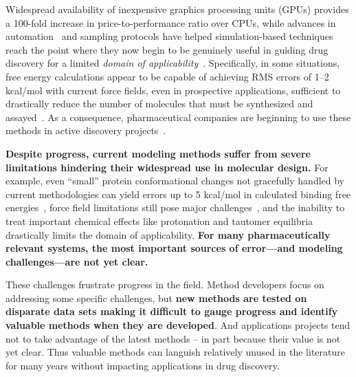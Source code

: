 \documentclass[11pt]{article}
\begin{document}
Widespread availability of inexpensive graphics processing units (GPUs) provides a 100-fold increase in price-to-performance ratio over CPUs, while advances in automation~\cite{liu_lead_2013} and sampling protocols have helped simulation-based techniques reach the point where they now begin to be genuinely useful in guiding drug discovery for a limited \emph{domain of applicability}~\cite{mikulskis_large-scale_2014, homeyer_binding_2014, Sherborne:2016:JComputAidedMolDes,  schrodinger_accurate_2015, christ_binding_2016, cui_affinity_2016, verras_free_2016}.
Specifically, in some situations, free energy calculations appear to be capable of achieving RMS errors of 1--2 kcal/mol with current force fields, even in prospective applications, sufficient to drastically reduce the number of molecules that must be synthesized and assayed~\cite{shirts_free-energy_2010, Aldeghi:2017:J.Am.Chem.Soc., schrodinger_accurate_2015}.
As a consequence, pharmaceutical companies are beginning to use these methods in active discovery projects~\cite{Sherborne:2016:JComputAidedMolDes}.

\textbf{Despite progress, current modeling methods suffer from severe limitations hindering their widespread use in molecular design.}
For example, even ``small'' protein conformational changes not gracefully handled by current methodologies can yield errors up to 5 kcal/mol in calculated binding free energies~\cite{lim_sensitivity_2016}, force field limitations still pose major challenges~\cite{rocklin_blind_2013}, and the inability to treat important chemical effects like protonation and tautomer equilibria drastically limits the domain of applicability.
{\bf For many pharmaceutically relevant systems, the most important sources of error---and modeling challenges---are not yet clear.~\cite{Sherborne:2016:JComputAidedMolDes}}

These challenges frustrate progress in the field. 
Method developers focus on addressing some specific challenges, but {\bf new methods are tested on disparate data sets making it difficult to gauge progress and identify valuable methods when they are developed}.
And applications projects tend not to take advantage of the latest methods -- in part because their value is not yet clear. 
Thus valuable methods can languish relatively unused in the literature for many years without impacting applications in drug discovery.
\end{document}
